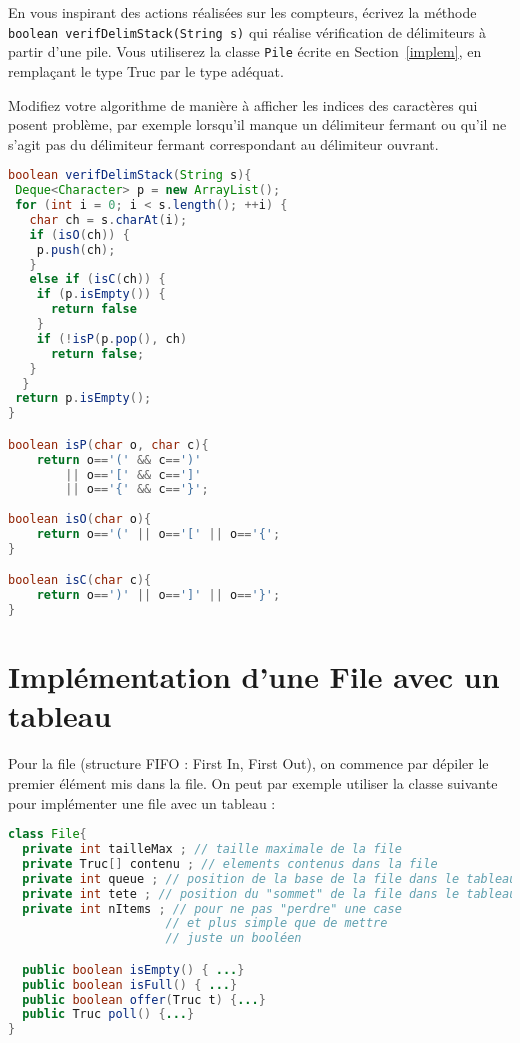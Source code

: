 \documentclass[iutinfo,a4paper,nocorrections,10pt]{ustl-tdtp}
\begin{document}
\question En vous inspirant des actions réalisées sur les compteurs, écrivez la méthode \texttt{boolean verifDelimStack(String s)} qui réalise vérification de délimiteurs à partir d'une pile. Vous utiliserez la classe \texttt{Pile} écrite en Section~\ref{implem}, en remplaçant le type Truc par le type adéquat.

\question Modifiez votre algorithme de manière à afficher les indices des caractères qui posent problème, par exemple lorsqu'il manque un délimiteur fermant ou qu'il ne s'agit pas du délimiteur fermant correspondant au délimiteur ouvrant.

\begin{correction}
{\color{red}

\begin{lstlisting}[language=Java]
boolean verifDelimStack(String s){
 Deque<Character> p = new ArrayList(); 
 for (int i = 0; i < s.length(); ++i) {
   char ch = s.charAt(i);
   if (isO(ch)) {
    p.push(ch);
   }
   else if (isC(ch)) {
    if (p.isEmpty()) {
      return false
    }
    if (!isP(p.pop(), ch)
      return false;
   }
  }
 return p.isEmpty();
}

boolean isP(char o, char c){
    return o=='(' && c==')'
        || o=='[' && c==']'
        || o=='{' && c=='}';
        
boolean isO(char o){
    return o=='(' || o=='[' || o=='{';
}

boolean isC(char c){
    return o==')' || o==']' || o=='}';
}


\end{lstlisting}

}
\end{correction}

\section{Implémentation d'une File avec un tableau} 

Pour la file (structure FIFO : First In, First Out), on commence par dépiler le premier élément mis dans la file. On peut
par exemple utiliser la classe suivante pour implémenter une file avec un tableau :


\begin{lstlisting}[language=Java]
class File{
  private int tailleMax ; // taille maximale de la file
  private Truc[] contenu ; // elements contenus dans la file
  private int queue ; // position de la base de la file dans le tableau
  private int tete ; // position du "sommet" de la file dans le tableau
  private int nItems ; // pour ne pas "perdre" une case
                      // et plus simple que de mettre 
                      // juste un booléen

  public boolean isEmpty() { ...}
  public boolean isFull() { ...}
  public boolean offer(Truc t) {...}
  public Truc poll() {...}
}

\end{lstlisting}
\end{document}
